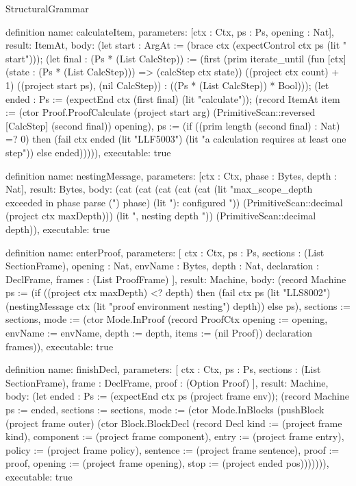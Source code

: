 \begin{lexlean}{StructuralGrammar}
\begin{semanticmodule}
{{definition{
  name: calculateItem,
  parameters: [ctx : Ctx, ps : Ps, opening : Nat],
  result: ItemAt,
  body: (let start : ArgAt := (brace ctx (expectControl ctx ps (lit "\\start"))); (let final : (Ps * (List CalcStep)) := (first (prim iterate_until (fun [ctx] (state : (Ps * (List CalcStep))) => (calcStep ctx state)) ((project ctx count) + 1) ((project start ps), (nil CalcStep)) : ((Ps * (List CalcStep)) * Bool))); (let ended : Ps := (expectEnd ctx (first final) (lit "calculate")); (record ItemAt {item := (ctor Proof.ProofCalculate (project start arg) (PrimitiveScan::reversed [CalcStep] (second final)) opening), ps := (if ((prim length (second final) : Nat) =? 0) then (fail ctx ended (lit "LLF5003") (lit "a calculation requires at least one step")) else ended)})))),
  executable: true
}

definition{
  name: nestingMessage,
  parameters: [ctx : Ctx, phase : Bytes, depth : Nat],
  result: Bytes,
  body: (cat (cat (cat (cat (cat (lit "max_scope_depth exceeded in phase parse (") phase) (lit "): configured ")) (PrimitiveScan::decimal (project ctx maxDepth))) (lit ", nesting depth ")) (PrimitiveScan::decimal depth)),
  executable: true
}

definition{
  name: enterProof,
  parameters: [
    ctx : Ctx,
    ps : Ps,
    sections : (List SectionFrame),
    opening : Nat,
    envName : Bytes,
    depth : Nat,
    declaration : DeclFrame,
    frames : (List ProofFrame)
  ],
  result: Machine,
  body: (record Machine {ps := (if ((project ctx maxDepth) <? depth) then (fail ctx ps (lit "LLS8002") (nestingMessage ctx (lit "proof environment nesting") depth)) else ps), sections := sections, mode := (ctor Mode.InProof (record ProofCtx {opening := opening, envName := envName, depth := depth, items := (nil Proof)}) declaration frames)}),
  executable: true
}

definition{
  name: finishDecl,
  parameters: [
    ctx : Ctx,
    ps : Ps,
    sections : (List SectionFrame),
    frame : DeclFrame,
    proof : (Option Proof)
  ],
  result: Machine,
  body: (let ended : Ps := (expectEnd ctx ps (project frame env)); (record Machine {ps := ended, sections := sections, mode := (ctor Mode.InBlocks (pushBlock (project frame outer) (ctor Block.BlockDecl (record Decl {kind := (project frame kind), component := (project frame component), entry := (project frame entry), policy := (project frame policy), sentence := (project frame sentence), proof := proof, opening := (project frame opening), stop := (project ended pos)}))))})),
  executable: true
}

}}
\end{semanticmodule}
\end{lexlean}
